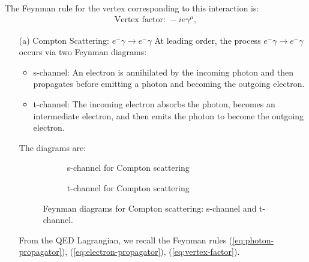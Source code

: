 The Feynman rule for the vertex corresponding to this interaction is:
\begin{align}
    \text{Vertex factor: } -i e \gamma^\mu,\label{eq:vertex-factor}
\end{align}
\begin{enumerate}
    \item [(a)] Compton Scattering: $e^- \gamma \rightarrow e^- \gamma$
At leading order, the process $e^- \gamma \rightarrow e^- \gamma$ occurs via two Feynman diagrams:
\begin{itemize}
    \item s-channel: An electron is annihilated by the incoming photon and then propagates before emitting a photon and becoming the outgoing electron.
    \item t-channel: The incoming electron absorbs the photon, becomes an intermediate electron, and then emits the photon to become the outgoing electron.
\end{itemize}
The diagrams are:
\begin{figure}[h!]
    \centering
    \begin{subfigure}[b]{0.45\textwidth}
        \centering
        \caption{s-channel for Compton scattering}
    \end{subfigure}
    \hfill
    \begin{subfigure}[b]{0.45\textwidth}
        \centering
        \caption{t-channel for Compton scattering}
    \end{subfigure}
    \caption{Feynman diagrams for Compton scattering: s-channel and t-channel.}
\end{figure}
From the QED Lagrangian, we recall the Feynman rules (\ref{eq:photon-propagator}), (\ref{eq:electron-propagator}), (\ref{eq:vertex-factor}).


\end{enumerate}
